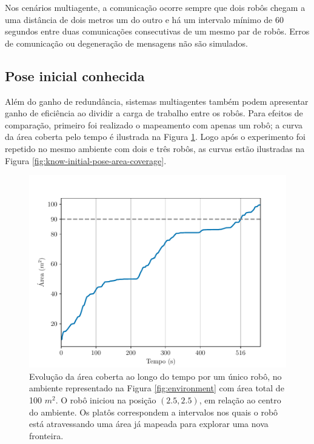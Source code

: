 Nos cenários multiagente, a comunicação ocorre sempre que dois robôs 
chegam a uma distância de dois metros um do outro e há um intervalo 
mínimo de 60 segundos entre duas comunicações consecutivas de um mesmo 
par de robôs. Erros de comunicação ou degeneração de mensagens não são 
simulados.



\subsection{Pose inicial conhecida}
\label{sec:exp-known-initial-pose}
Além do ganho de redundância, sistemas multiagentes também podem 
apresentar ganho de eficiência ao dividir a carga de trabalho entre os 
robôs. Para efeitos de comparação, primeiro foi realizado o mapeamento 
com apenas um robô; a curva da área coberta pelo tempo é ilustrada na 
Figura \ref{fig:area-coverage-single-robot}. Logo após o experimento foi repetido no mesmo ambiente com dois e três 
robôs, as curvas estão ilustradas na Figura \ref{fig:know-initial-pose-area-coverage}.

\begin{figure}
  \centering
  \includegraphics[width=.6\textwidth]{figs/area_coverage_single_robot.pdf}
  \caption[Evolução da área coberta por um único robô]{Evolução da área coberta ao longo do tempo por um único robô, 
  no ambiente representado na Figura \ref{fig:environment} com área total 
  de 100 $m^2$. O robô iniciou na posição $(2.5, 2.5)$, em relação ao centro do ambiente. Os platôs correspondem a intervalos nos quais o robô está atravessando uma área já mapeada para explorar uma nova fronteira.}
  \label{fig:area-coverage-single-robot}
\end{figure}

